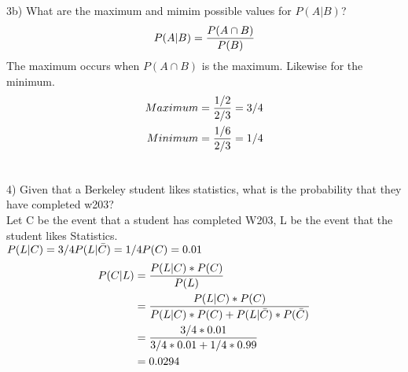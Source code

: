 \documentclass[fleqn]{article}
\begin{document}
3b) What are the maximum and mimim possible values for $P(A|B)$?\\
\begin{equation} \begin{aligned}
P(A |B) = {P(A \cap B) \over P(B)}
\end{aligned} \end{equation}
The maximum occurs when $P(A \cap B)$ is the maximum. Likewise for the minimum. \\
\begin{equation} \begin{aligned}
Maximum = {1/2 \over 2/3} = 3/4\\
Minimum = {1/6 \over 2/3} = 1/4\\ \\
\end{aligned} \end{equation}

4) Given that a Berkeley student likes statistics, what is the probability that they have completed w203?\\
Let C be the event that a student has completed W203, L be the event that the student likes Statistics.\\
$P(L|C) = 3/4 \\
P(L|\bar C) = 1/4 \\
P(C) = 0.01 \\$
\begin{equation} \begin{aligned}
P(C|L) &= {P(L | C)*P(C) \over P(L)} \\
	&= {P(L | C)*P(C) \over P(L|C) * P(C) + P(L| \bar C) * P(\bar C)} \\
	&= {3/4 * 0.01 \over 3/4*0.01 + 1/4*0.99} \\
	&= 0.0294\\
\end{aligned} \end{equation}
\end{document}
